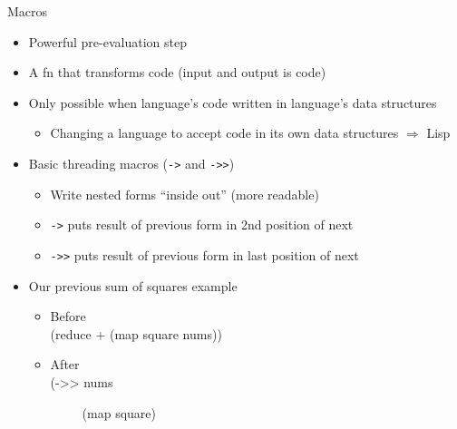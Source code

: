 \documentclass{beamer}
\begin{document}
\begin{frame}[allowframebreaks]{Macros}
  \begin{itemize}
  \item Powerful pre-evaluation step
  \item A fn that transforms code (input and output is code)
  \item Only possible when language's code written in language's data
    structures
    \begin{itemize}
    \item Changing a language to accept code in its own data structures
      $\Rightarrow$ Lisp
    \end{itemize}

    \framebreak
  \item Basic threading macros (\texttt{->} and \texttt{->>})
    \begin{itemize}
    \item Write nested forms ``inside out'' (more readable)
    \item \texttt{->} puts result of previous form in 2nd position
      of next
    \item \texttt{->>} puts result of previous form in last position
      of next    
    \end{itemize}
  \item Our previous sum of squares example
    \begin{itemize}
    \item Before\\
{\ttfamily\color{black}
%
\textcolor[rgb]{0.54901963,0.54901963,0.54901963}{(}\textcolor[rgb]{0.28235295,0.23921569,0.54509807}{reduce}
+
\textcolor[rgb]{0.54901963,0.54901963,0.54901963}{(}\textcolor[rgb]{0.28235295,0.23921569,0.54509807}{map}
square nums\textcolor[rgb]{0.54901963,0.54901963,0.54901963}{))}}
    \item After\\
{\ttfamily\color{black}
\textcolor[rgb]{0.54901963,0.54901963,0.54901963}{(}\textcolor[rgb]{0.49803922,0.0,0.49803922}{{}-{\textgreater}{\textgreater}}
nums}

{\ttfamily\color{black}
\ \ \ \ \ \textcolor[rgb]{0.54901963,0.54901963,0.54901963}{(}\textcolor[rgb]{0.28235295,0.23921569,0.54509807}{map}
square\textcolor[rgb]{0.54901963,0.54901963,0.54901963}{)}}


\end{itemize}
\end{itemize}
\end{frame}
\end{document}
